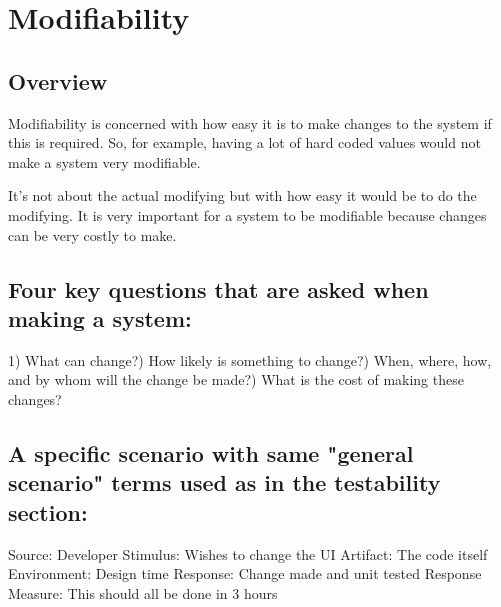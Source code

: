 \documentclass{report}
\begin{document}
\chapter{Modifiability}
\section{Overview}
Modifiability is concerned with how easy it is to make changes to the system if this is required. So, for example, having a lot of hard coded values would not make a system very modifiable.

It's not about the actual modifying but with how easy it would be to do the modifying.
It is very important for a system to be modifiable because changes can be very costly to make.

\section{Four key questions that are asked when making a system:}
1)   What can change?)   How likely is something to change?)   When, where, how, and by whom will the change be made?)   What is the cost of making these changes? \newline

\section{A specific scenario with same "general scenario" terms used as in the testability section:}

Source: Developer \newline
Stimulus: Wishes to change the UI \newline
Artifact: The code itself \newline
Environment: Design time \newline
Response: Change made and unit tested \newline
Response Measure: This should all be done in 3 hours \newline
\end{document}
